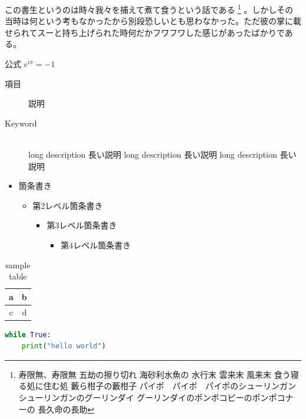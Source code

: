 \begin{multicols}{2}
この書生というのは時々我々を捕えて煮て食うという話である
\footnote{
寿限無、寿限無
五劫の擦り切れ
海砂利水魚の
水行末 雲来末 風来末
食う寝る処に住む処
藪ら柑子の藪柑子
パイポ　パイポ　パイポのシューリンガン
シューリンガンのグーリンダイ
グーリンダイのポンポコピーのポンポコナーの
長久命の長助
}
。しかしその当時は何という考もなかったから別段恐しいとも思わなかった。ただ彼の掌に載せられてスーと持ち上げられた時何だかフワフワした感じがあったばかりである。


\begin{itembox}[l]{公式}
$e^{i \pi} = -1$
\end{itembox}

\begin{description}
\item[項目] 説明
\item[Keyword]\mbox{}\\
    long description 長い説明
    long description 長い説明
    long description 長い説明
\end{description}

\begin{itemize}
    \item 箇条書き
    \begin{itemize}
        \item 第2レベル箇条書き
        \begin{itemize}
            \item 第3レベル箇条書き
            \begin{itemize}
                \item 第4レベル箇条書き
            \end{itemize}
        \end{itemize}
    \end{itemize}
\end{itemize}

\begin{table}[H]
\centering
\caption{sample table \label{tab:ta}}
\begin{tabular}{|c|c|} \hline
a & b \\ \hline
c & d \\ \hline
\end{tabular}
\end{table}

\begin{lstlisting}[language=python,caption=hello code \label{src:hello}]
while True:
    print("hello world")
\end{lstlisting}

\end{multicols}

